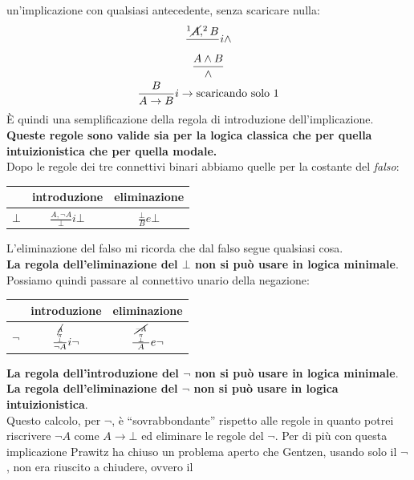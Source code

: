 \documentclass[a4paper,12pt, oneside]{book}
\newcommand*{\bfrac}[2]{\genfrac{}{}{0pt}{}{#1}{#2}}
\begin{document}
un'implicazione con qualsiasi antecedente, senza scaricare nulla:
\begin{gather*}
  \frac{^1\cancel{A},^2B}{}i\land\\
  \frac{A\land B}\land\\
  \frac{B}{A\to B}i\to\mbox{scaricando solo 1}
\end{gather*}
È quindi una semplificazione della regola di introduzione dell'implicazione.\\
\textbf{Queste regole sono valide sia per la logica classica che per quella
  intuizionistica che per quella modale.}\\
Dopo le regole dei tre connettivi binari abbiamo quelle per la costante del
\textit{falso}:
\begin{table}[H]
  \Large
  \centering
  \begin{tabular}{c||c|c}
    & introduzione & eliminazione\\
    \hline
    \hline
    $\bot$ & $\frac{A,\neg A}{\bot}i\bot$& $\frac{\bot}{B}e\bot$\\
    \hline
  \end{tabular}
\end{table}
L'eliminazione del falso mi ricorda che dal falso segue qualsiasi cosa. \\
\textbf{La regola dell'eliminazione del $\bot$ non si può usare in logica
  minimale}. \\
Possiamo quindi passare al connettivo unario della negazione:
\begin{table}[H]
  \Large
  \centering
  \begin{tabular}{c||c|c}
    & introduzione & eliminazione\\
    \hline
    \hline
    $\neg$ & $\frac{\bfrac{\bfrac{\cancel{A}}{\pi}}
             {\bot}}{\neg A}i\neg$& $\frac{\bfrac{\bfrac{\cancel{\neg A}}{\pi}}
             {\bot}}{ A}e\neg$\\
    \hline
  \end{tabular}
\end{table}
\textbf{La regola dell'introduzione del $\neg$ non si può usare in logica
  minimale}.\\
\textbf{La regola dell'eliminazione del $\neg$ non si può usare in logica
  intuizionistica}.\\
Questo calcolo, per $\neg$, è ``sovrabbondante'' rispetto alle regole in quanto
potrei riscrivere $\neg A$ come $A\to\bot$ ed eliminare le regole del
$\neg$. Per di più con questa implicazione Prawitz ha chiuso un problema aperto
che Gentzen, usando solo il $\neg$, non era riuscito a chiudere, ovvero il
\end{document}
